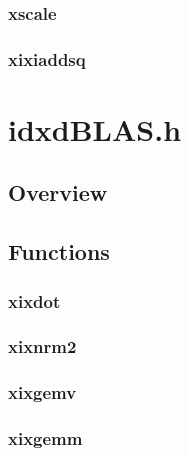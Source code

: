 \documentclass[12pt]{article}
\theoremstyle{plain}
\begin{document}
    \subsubsection{xscale}
    \subsubsection{xixiaddsq}
\section{idxdBLAS.h}
  \subsection{Overview}
  \subsection{Functions}
    \subsubsection{xixdot}
    \subsubsection{xixnrm2}
    \subsubsection{xixgemv}
    \subsubsection{xixgemm}
\end{document}
